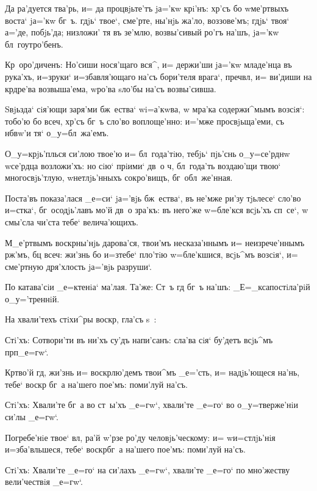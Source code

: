 Да ра'дуется тва'рь, и= да процвjьте'тъ jа='кw крi'нъ: 
хр'съ бо w\т ме'ртвыхъ воста` jа='кw бг~ъ. гдjь` 
твое`, сме'рте, ны'нjь жа'ло, воззове'мъ; гдjь` твоя` 
а='де, побjь'да; низложи' тя въ зе'млю, возвы'сивый ро'гъ 
на'шъ, jа='кw бл~гоутро'бенъ.

Кр~оро'диченъ: Но'сиши нося'щаго вся^, и= 
держи'ши jа='кw младе'нца въ рука'хъ, и=з\ъ руки` 
и=збавля'ющаго на'съ бори'теля врага`, преч вл, 
и= ви'диши на кр дре'ва возвыша'ема, w\т ро'ва sло'бы 
на'съ возвы'сивша. 


Sвjьзда` сiя'ющи заря'ми бж~ества` w\т i=а'кwва, w\т 
мра'ка содержи^мымъ возсiя`: тобо'ю бо всеч, 
хр'съ бг~ъ сло'во воплоще'нно: и='мже просвjьща'еми, 
съ нб вw'и тя` о_у=бл~жа'емъ.

О_у=крjь'плься си'лою твое'ю и= бл~года'тiю, тебjь` 
пjь'снь о_у=се'рднw w\т се'рдца возложи'хъ: но сiю` 
прiими` дв~о ч, бл~года'ть воздаю'щи твою` 
многосвjь'тлую, w\т нетлjь'нныхъ сокро'вищъ, 
бг~обл~же'нная.

Поста'въ показа'лася _е=си` jа='вjь бж~ества`, въ 
не'мже ри'зу тjьлесе` сло'во и=стка`, бг~осодjь'лавъ мо'й 
дв~о зра'къ: въ него'же w=бле'кся всjь'хъ сп~се`, w\т 
смы'сла чи'ста тебе` велича'ющихъ.

М_е'ртвымъ воскр ны'нjь дарова'ся, твои'мъ 
несказа'ннымъ и= неизрече'ннымъ рж'мъ, бц 
всеч: жи'знь бо и=з\ъ тебе` пло'тiю w=бле'кшися, 
всjь^мъ возсiя`, и= сме'ртную дря'хлость jа='вjь 
разруши`.

По катава'сiи _е=ктенiа` ма'лая. Та'же: Ст~ъ гд 
бг~ъ на'шъ: _Е=_ксапостiла'рiй о_у='треннiй. 

На хвали'техъ стiхи^ры воскр, гла'съ s~:

Стi'хъ: Сотвори'ти въ ни'хъ су'дъ напи'санъ: сла'ва 
сiя` бу'детъ всjь^мъ прп _е=гw`.

Кр тво'й гд, жи'знь и= воскр лю'демъ 
твои^мъ _е='сть, и= надjь'ющеся на'нь, тебе` воскр 
бг~а на'шего пое'мъ: поми'луй на'съ.

Стi'хъ: Хвали'те бг~а во ст~ы'хъ _е=гw`, хвали'те 
_е=го` во о_у=тверже'нiи си'лы _е=гw`.

Погребе'нiе твое` вл, ра'й w'рзе ро'ду 
человjь'ческому: и= w\т и=стлjь'нiя и=зба'вльшеся, тебе` 
воскр бг~а на'шего пое'мъ: поми'луй на'съ.

Стi'хъ: Хвали'те _е=го` на си'лахъ _е=гw`, хвали'те 
_е=го` по мно'жеству вели'чествiя _е=гw`.


